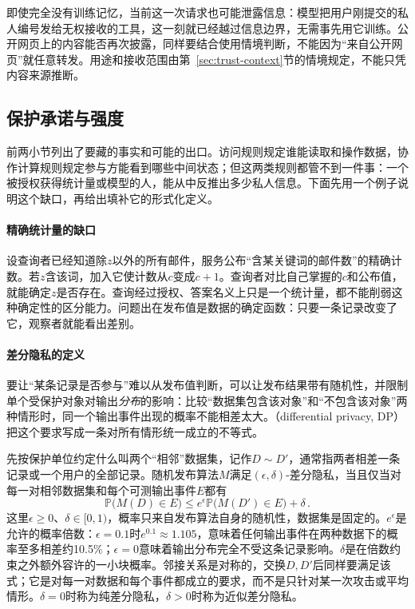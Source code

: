即使完全没有训练记忆，当前这一次请求也可能泄露信息：模型把用户刚提交的私人编号发给无权接收的工具，这一刻就已经越过信息边界，无需事先用它训练。公开网页上的内容能否再次披露，同样要结合使用情境判断，不能因为“来自公开网页”就任意转发。用途和接收范围由第~\ref{sec:trust-context}节的情境规定，不能只凭内容来源推断。

\subsection{保护承诺与强度}
\label{sec:privacy-guarantees}

前两小节列出了要藏的事实和可能的出口。访问规则规定谁能读取和操作数据，协作计算规则规定参与方能看到哪些中间状态；但这两类规则都管不到一件事：一个被授权获得统计量或模型的人，能从中反推出多少私人信息。下面先用一个例子说明这个缺口，再给出填补它的形式化定义。

\paragraph{精确统计量的缺口}

设查询者已经知道除$z$以外的所有邮件，服务公布“含某关键词的邮件数”的精确计数。若$z$含该词，加入它使计数从$c$变成$c+1$。查询者对比自己掌握的$c$和公布值，就能确定$z$是否存在。查询经过授权、答案名义上只是一个统计量，都不能削弱这种确定性的区分能力。问题出在发布值是数据的确定函数：只要一条记录改变了它，观察者就能看出差别。

\paragraph{差分隐私的定义}

要让“某条记录是否参与”难以从发布值判断，可以让发布结果带有随机性，并限制单个受保护对象对输出\emph{分布}的影响：比较“数据集包含该对象”和“不包含该对象”两种情形时，同一个输出事件出现的概率不能相差太大。（differential privacy, DP）把这个要求写成一条对所有情形统一成立的不等式。

先按保护单位约定什么叫两个“相邻”数据集，记作$D\sim D'$，通常指两者相差一条记录或一个用户的全部记录。随机发布算法$M$满足$(\epsilon,\delta)$-差分隐私，当且仅当对每一对相邻数据集和每个可测输出事件$E$都有
\begin{equation}
 \mathbb P\bigl(M(D)\in E\bigr)
 \leq e^\epsilon\mathbb P\bigl(M(D')\in E\bigr)+\delta\, .
 \label{eq:privacy-dp-definition}
\end{equation}
这里$\epsilon\geq0$、$\delta\in[0,1)$，概率只来自发布算法自身的随机性，数据集是固定的。$e^\epsilon$是允许的概率倍数：$\epsilon=0.1$时$e^{0.1}\approx1.105$，意味着任何输出事件在两种数据下的概率至多相差约10.5\%；$\epsilon=0$意味着输出分布完全不受这条记录影响。$\delta$是在倍数约束之外额外容许的一小块概率。邻接关系是对称的，交换$D,D'$后同样要满足该式；它是对每一对数据和每个事件都成立的要求，而不是只针对某一次攻击或平均情形。$\delta=0$时称为纯差分隐私，$\delta>0$时称为近似差分隐私。

